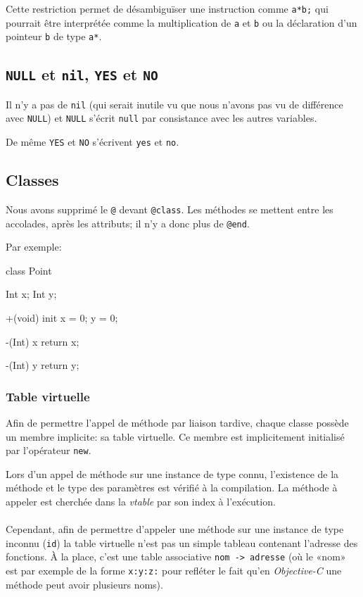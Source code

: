 \documentclass{scrartcl}
\newcommand{\objc}{\textit{Objective-C}}
\begin{document}
    Cette restriction permet de désambiguïser une instruction comme
    \verb+a*b;+ qui pourrait être interprétée comme la multiplication de
    \verb+a+ et \verb+b+ ou la déclaration d'un pointeur \verb+b+ de type
    \verb+a*+.

  \subsection{\texttt{NULL} et \texttt{nil}, \texttt{YES} et \texttt{NO}}
    Il n'y a pas de \verb+nil+ (qui serait inutile vu que nous n'avons pas vu
    de différence avec \verb+NULL+) et \verb+NULL+ s'écrit \verb+null+ par
    consistance avec les autres variables.

    De même \verb+YES+ et \verb+NO+ s'écrivent \verb+yes+ et \verb+no+.

  \subsection{Classes}
    Nous avons supprimé le \verb+@+ devant \verb+@class+. Les méthodes se
    mettent entre les accolades, après les attributs; il n'y a donc plus de
    \verb+@end+.

    Par exemple:
    \begin{moccode}
class Point {
    Int x;
    Int y;

    +(void) init {
      x = 0; y = 0;
    }

    -(Int) x {
        return x;
    }

    -(Int) y {
        return y;
    }
}
    \end{moccode}

    \subsubsection{Table virtuelle}\label{sec:vtable}
      Afin de permettre l'appel de méthode par liaison tardive, chaque classe
      possède un membre implicite: sa table virtuelle. Ce membre est
      implicitement initialisé par l'opérateur \verb+new+.

      Lors d'un appel de méthode sur une instance de type connu, l'existence de
      la méthode et le type des paramètres est vérifié à la compilation. La
      méthode à appeler est cherchée dans la \textit{vtable} par son index à
      l'exécution.

      \paragraph{}
      Cependant, afin de permettre d'appeler une méthode sur une instance de
      type inconnu (\verb+id+) la table virtuelle n'est pas un simple tableau
      contenant l'adresse des fonctions. À la place, c'est une table
      associative \verb+nom -> adresse+ (où le «nom» est par exemple de la
      forme \verb+x:y:z:+ pour refléter le fait qu'en \objc{} une méthode peut
      avoir plusieurs noms).
\end{document}
